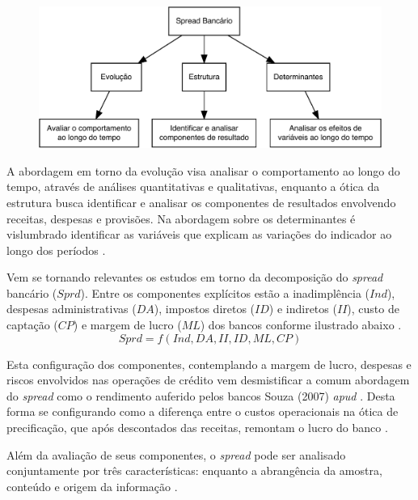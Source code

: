 \documentclass[12pt,12pt,openright,oneside,a4paper,chapter=TITLE,section=TITLE,subsection=TITLE,subsubsection=TITLE,english,french,spanish,portugues,sumario=tradicional]{abntex2}
\begin{document}
\begin{figure}

\begin{center}\includegraphics{12-exportedfigures/diagram.spread.otic-1} \end{center}
\label{fig:diagrama}
\end{figure}

A abordagem em torno da evolução visa analisar o comportamento ao longo do
tempo, através de análises quantitativas e qualitativas, enquanto a ótica da
estrutura busca identificar e analisar os componentes de resultados envolvendo
receitas, despesas e provisões. Na abordagem sobre os determinantes é
vislumbrado identificar as variáveis que explicam as variações do indicador ao
longo dos períodos \cite{leal:2006}.

Vem se tornando relevantes os estudos em torno da decomposição do \emph{spread} bancário (\(Sprd\)). Entre os componentes explícitos estão a inadimplência (\(Ind\)), despesas administrativas (\(DA\)), impostos diretos (\(ID\)) e indiretos (\(II\)), custo de captação (\(CP\)) e margem de lucro (\(ML\)) dos bancos conforme ilustrado abaixo \cite{BCB:2000}.
\[
Sprd=f(Ind, DA, II, ID, ML, CP)
\]

Esta configuração dos componentes, contemplando a margem de lucro, despesas e
riscos envolvidos nas operações de crédito vem desmistificar a comum abordagem
do \emph{spread} como o rendimento auferido pelos bancos \cite{costa;nakane:2004}
Souza (2007) \emph{apud} \cite{dantas:2012}. Desta forma se configurando como a
diferença entre o custos operacionais na ótica de precificação, que após
descontados das receitas, remontam o lucro do banco \cite{BCB:2016}.

Além da avaliação de seus componentes, o \emph{spread} pode ser analisado
conjuntamente por três características: enquanto a abrangência da amostra,
conteúdo e origem da informação \cite{leal:2006}.
\end{document}

